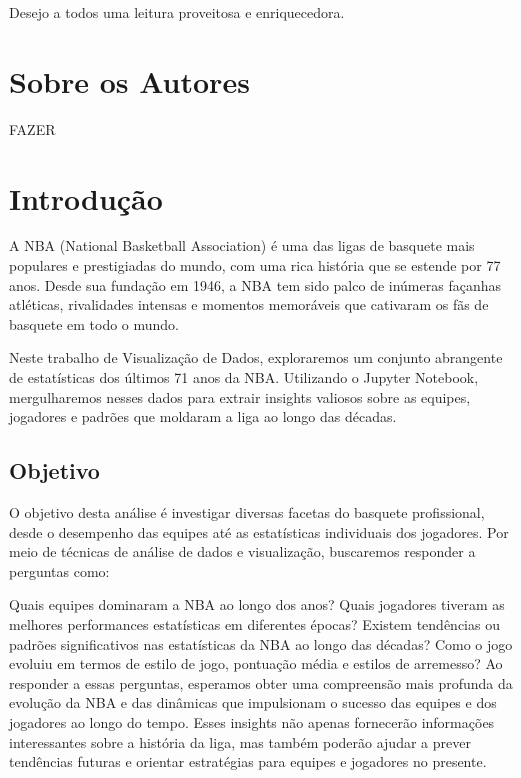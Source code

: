 \documentclass[
]{book}
\begin{document}
Desejo a todos uma leitura proveitosa e enriquecedora.

\hypertarget{author}{%
\chapter*{Sobre os Autores}\label{author}}

FAZER

\hypertarget{introduuxe7uxe3o}{%
\chapter{Introdução}\label{introduuxe7uxe3o}}

A NBA (National Basketball Association) é uma das ligas de basquete mais populares e prestigiadas do mundo, com uma rica história que se estende por 77 anos. Desde sua fundação em 1946, a NBA tem sido palco de inúmeras façanhas atléticas, rivalidades intensas e momentos memoráveis que cativaram os fãs de basquete em todo o mundo.

Neste trabalho de Visualização de Dados, exploraremos um conjunto abrangente de estatísticas dos últimos 71 anos da NBA. Utilizando o Jupyter Notebook, mergulharemos nesses dados para extrair insights valiosos sobre as equipes, jogadores e padrões que moldaram a liga ao longo das décadas.

\hypertarget{objetivo}{%
\section{Objetivo}\label{objetivo}}

O objetivo desta análise é investigar diversas facetas do basquete profissional, desde o desempenho das equipes até as estatísticas individuais dos jogadores. Por meio de técnicas de análise de dados e visualização, buscaremos responder a perguntas como:

Quais equipes dominaram a NBA ao longo dos anos? Quais jogadores tiveram as melhores performances estatísticas em diferentes épocas? Existem tendências ou padrões significativos nas estatísticas da NBA ao longo das décadas? Como o jogo evoluiu em termos de estilo de jogo, pontuação média e estilos de arremesso? Ao responder a essas perguntas, esperamos obter uma compreensão mais profunda da evolução da NBA e das dinâmicas que impulsionam o sucesso das equipes e dos jogadores ao longo do tempo. Esses insights não apenas fornecerão informações interessantes sobre a história da liga, mas também poderão ajudar a prever tendências futuras e orientar estratégias para equipes e jogadores no presente.
\end{document}
